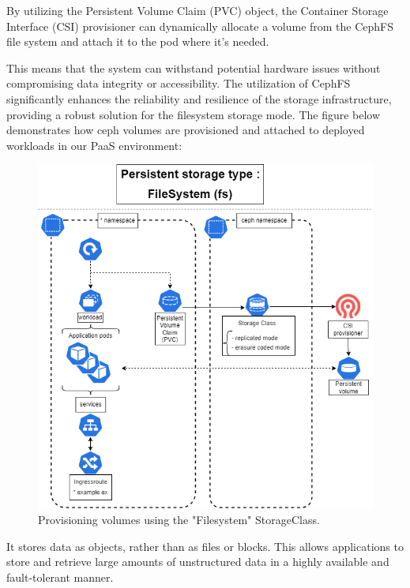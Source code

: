 \hspace{7mm}By utilizing the Persistent Volume Claim (PVC) object, the Container Storage Interface (CSI) provisioner can dynamically allocate a volume from the CephFS file system and attach it to the pod where it's needed.

\hspace{7mm}This means that the system can withstand potential hardware issues without compromising data integrity or accessibility. The utilization of CephFS significantly enhances the reliability and resilience of the storage infrastructure, providing a robust solution for the filesystem storage mode.
\newpage
\hspace{7mm}The figure below demonstrates how ceph volumes are provisioned and attached to deployed workloads in our PaaS environment:

\begin{figure}[H]\centering
\includegraphics[width=1.0\textwidth,angle=00]{assets/f31.png}
\caption{Provisioning volumes using the "Filesystem" StorageClass. }
\label{fig:Filesystem Storage}
\end{figure}


\hspace{7mm}It stores data as objects, rather than as files or blocks. This allows applications to store and retrieve large amounts of unstructured data in a highly available and fault-tolerant manner.


